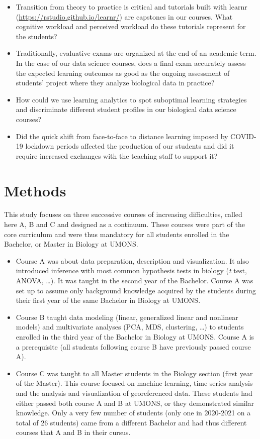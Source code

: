 \documentclass{aims}
\theoremstyle{definition}
\begin{document}
\begin{itemize}
\item
  Transition from theory to practice is critical and tutorials built
  with learnr (\url{https://rstudio.github.io/learnr/}) are capstones in
  our courses. What cognitive workload and perceived workload do these
  tutorials represent for the students?
\item
  Traditionally, evaluative exams are organized at the end of an
  academic term. In the case of our data science courses, does a final
  exam accurately assess the expected learning outcomes as good as the
  ongoing assessment of students' project where they analyze biological
  data in practice?
\item
  How could we use learning analytics to spot suboptimal learning
  strategies and discriminate different student profiles in our
  biological data science courses?
\item
  Did the quick shift from face-to-face to distance learning imposed by
  COVID-19 lockdown periods affected the production of our students and
  did it require increased exchanges with the teaching staff to support
  it?
\end{itemize}

\hypertarget{methods}{%
\section{Methods}\label{methods}}

This study focuses on three successive courses of increasing
difficulties, called here A, B and C and designed as a continuum. These
courses were part of the core curriculum and were thus mandatory for all
students enrolled in the Bachelor, or Master in Biology at UMONS.

\begin{itemize}
\item
  Course A was about data preparation, description and visualization. It
  also introduced inference with most common hypothesis tests in biology
  (\emph{t} test, ANOVA, \ldots). It was taught in the second year of
  the Bachelor. Course A was set up to assume only background knowledge
  acquired by the students during their first year of the same Bachelor
  in Biology at UMONS.
\item
  Course B taught data modeling (linear, generalized linear and
  nonlinear models) and multivariate analyses (PCA, MDS, clustering,
  \ldots) to students enrolled in the third year of the Bachelor in
  Biology at UMONS. Course A is a prerequisite (all students following
  course B have previously passed course A).
\item
  Course C was taught to all Master students in the Biology section
  (first year of the Master). This course focused on machine learning,
  time series analysis and the analysis and visualization of
  georeferenced data. These students had either passed both course A and
  B at UMONS, or they demonstrated similar knowledge. Only a very few
  number of students (only one in 2020-2021 on a total of 26 students)
  came from a different Bachelor and had thus different courses that A
  and B in their cursus.
\end{itemize}
\end{document}
